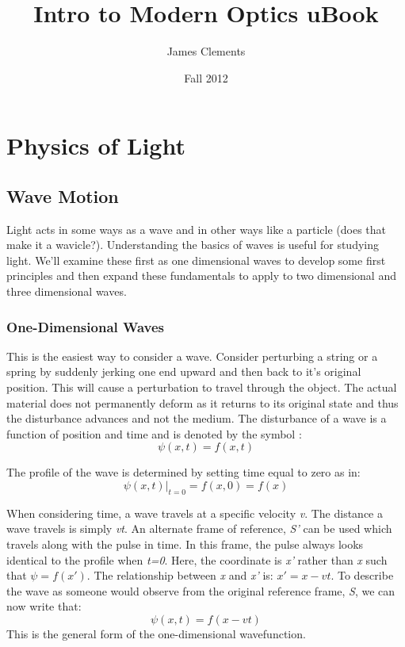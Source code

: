 \documentclass[12pt]{report}
\begin{document}
\title{Intro to Modern Optics uBook}
\author{James Clements}
\date{Fall 2012}
\maketitle
\tableofcontents
\part{Physics of Light}
\chapter{Wave Motion}
Light acts in some ways as a wave and in other ways like a particle (does that make it a wavicle?). Understanding the basics of waves is useful for studying light. We'll examine these first as one dimensional waves to develop some first principles and then expand these fundamentals to apply to two dimensional and three dimensional waves.
\section{One-Dimensional Waves}
This is the easiest way to consider a wave. Consider perturbing a string or a spring by suddenly jerking one end upward and then back to it's original position. This will cause a perturbation to travel through the object. The actual material does not permanently deform as it returns to its original state and thus the disturbance advances and not the medium. The disturbance of a wave is a function of position and time and is denoted by the symbol \textpsi : 
\[\psi (x,t) = f(x,t)\]

The profile of the wave is determined by setting time equal to zero as in: 
\[\psi(x,t)|_{t=0} = f(x,0) = f(x) \]

When considering time, a wave travels at a specific velocity \emph{v}. The distance a wave travels is simply \emph{vt}. An alternate frame of reference, \emph{S'} can be used which travels along with the pulse in time. In this frame, the pulse always looks identical to the profile when \emph{t=0}. Here, the coordinate is \emph{x'} rather than \emph{x} such that $ \psi = f(x') $. The relationship between \emph{x} and \emph{x'} is: $ x' = x - vt $. To describe the wave as someone would observe from the original reference frame, \emph{S}, we can now write that:
\[\psi(x,t) =f(x-vt)\]
This is the general form of the one-dimensional wavefunction. 
\end{document}
